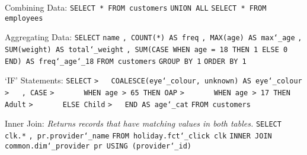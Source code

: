 \vspace{\baselineskip}
Combining Data:\newline
\texttt{SELECT * FROM customers}\newline
\texttt{UNION ALL}\newline
\texttt{SELECT * FROM employees}

\vspace{\baselineskip}
Aggregating Data:\newline
\texttt{SELECT}\newline
\texttt{name}\newline
\texttt{, COUNT(*) AS freq}\newline
\texttt{, MAX(age) AS max\char`_age}\newline
\texttt{, SUM(weight) AS total\char`_weight}\newline
\texttt{, SUM(CASE WHEN age = 18 THEN 1 ELSE 0 END) AS freq\char`_age\char`_18}\newline
\texttt{FROM customers}\newline
\texttt{GROUP BY 1}\newline
\texttt{ORDER BY 1}

\newpage
`IF' Statements:\newline
\texttt{SELECT}\newline
\texttt{>~~~COALESCE(eye\char`_colour, \textquotesingle unknown\textquotesingle) AS eye\char`_colour}\newline
\texttt{>~~~, CASE}\newline
\texttt{>~~~~~~~WHEN age > 65 THEN \textquotesingle OAP\textquotesingle}\newline
\texttt{>~~~~~~~WHEN age > 17 THEN \textquotesingle Adult\textquotesingle}\newline
\texttt{>~~~~~~~ELSE \textquotesingle Child\textquotesingle}\newline
\texttt{>~~~END AS age\char`_cat}\newline
\texttt{FROM customers}

\vspace{\baselineskip}
Inner Join:\newline
\textit{Returns records that have matching values in both tables.}\newline
\texttt{SELECT}\newline
\texttt{clk.*}\newline
\texttt{, pr.provider\char`_name}\newline
\texttt{FROM holiday.fct\char`_click clk}\newline
\texttt{INNER JOIN common.dim\char`_provider pr USING (provider\char`_id)}

